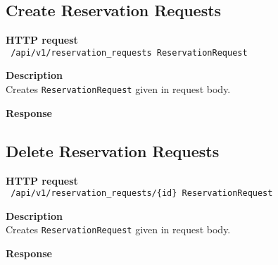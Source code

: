 \subsection{Create Reservation Requests}
\begin{description}
    \item \textbf{HTTP request}\\
        \texttt{\text{[POST]} /api/v1/reservation\_requests \texttt{ReservationRequest}}
    \item \textbf{Description}\\
        Creates \texttt{ReservationRequest} given in request body.
    \item \textbf{Response}\\
        \texttt{\text{[200 OK]}}
\end{description}

\subsection{Delete Reservation Requests}
\begin{description}
    \item \textbf{HTTP request}\\
        \texttt{\text{[DELETE]} /api/v1/reservation\_requests/\{id\} \texttt{ReservationRequest}}
    \item \textbf{Description}\\
        Creates \texttt{ReservationRequest} given in request body.
    \item \textbf{Response}\\
        \texttt{\text{[200 OK]}}
\end{description}
